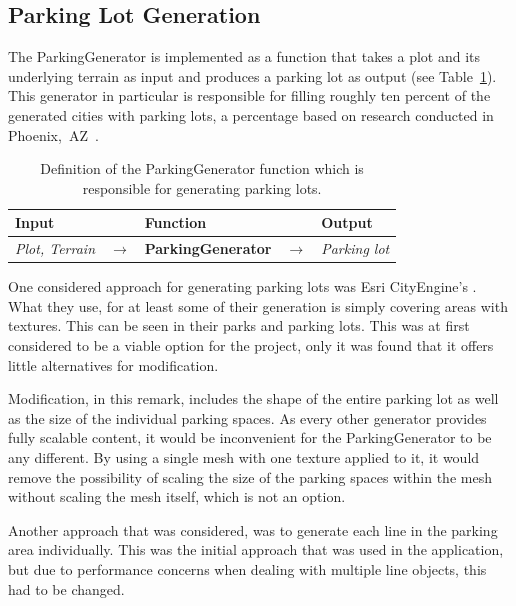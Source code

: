 \subsection{Parking Lot Generation}
The ParkingGenerator is implemented as a function that takes a plot and its underlying terrain as input and produces a parking lot as output (see Table~\ref{table:parking}).
This generator in particular is responsible for filling roughly ten percent of the generated cities with parking lots, a percentage based on research conducted in Phoenix,~AZ~\cite{parking_percent}.
\begin{table}[H]
   \centering
   \begin{tabular}{lllll}
     \textbf{Input}                           &               & \textbf{Function}            &               & \textbf{Output}         \\
     \midrule
     \textit{Plot, Terrain}                   & $\rightarrow$ & \textbf{ParkingGenerator}       & $\rightarrow$ & \textit{Parking lot}           \\
     \bottomrule
   \end{tabular}

   \caption{Definition of the ParkingGenerator function which is responsible for generating parking lots.}
   \label{table:parking}
 \end{table}
 \vspace{-0.4cm}

One considered approach for generating parking lots was Esri CityEngine's \cite{Esri}.  %
What they use, for at least some of their generation is simply covering areas with textures. This can be seen in their parks and parking lots. 
This was at first considered to be a viable option for the project, only it was found that it offers little alternatives for modification.

Modification, in this remark, includes the shape of the entire parking lot as well as the size of the individual parking spaces.
As every other generator provides fully scalable content, it would be inconvenient for the ParkingGenerator to be any different.
By using a single mesh with one texture applied to it, it would remove the possibility of scaling the size of the parking spaces within the mesh without scaling the mesh itself, which is not an option.

Another approach that was considered, was to generate each line in the parking area individually. 
This was the initial approach that was used in the application, but due to performance concerns when dealing with multiple line objects, this had to be changed.

